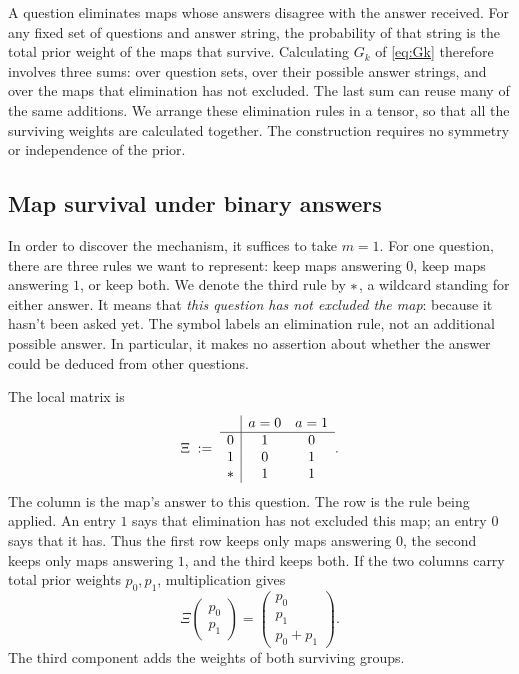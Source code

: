 \documentclass[11pt]{article}
\newcommand{\wild}{\mathord{\text{\normalsize$\ast$}}}
\begin{document}
A question eliminates maps whose answers disagree with the answer received.
For any fixed set of questions and answer string, the probability of that
string is the total prior weight of the maps that survive. Calculating
$G_k$ of \eqref{eq:Gk} therefore involves three sums: over question sets, over their possible
answer strings, and over the maps that elimination has not excluded.
The last sum can reuse many of the same additions. We arrange these
elimination rules in a tensor, so that all the surviving weights are
calculated together. The construction requires no symmetry or independence
of the prior.

\subsection{Map survival under binary answers}

In order to discover the mechanism, it suffices to take $m=1$. For one question, there are three rules we want to represent:
keep maps answering $0$, keep maps answering $1$, or keep both. We denote the third rule by $\wild$, a wildcard standing for either
answer. It means that \emph{this question has not excluded the map}: because it hasn't been asked yet.
The symbol labels an elimination rule, not an additional possible answer.
In particular, it makes no assertion about whether the answer could be
deduced from other questions.

The local matrix is
\begin{equation}\label{eq:Xi-binary}
  \Xi\;:=\;
  \begin{array}{c|cc}
    &a=0&a=1\\ \hline
    0&1&0\\
    1&0&1\\
    \wild&1&1
  \end{array}.
\end{equation}
The column is the map's answer to this question. The row is the rule being
applied. An entry $1$ says that elimination has not excluded this map;
an entry $0$ says that it has. Thus the first row keeps only maps answering
$0$, the second keeps only maps answering $1$, and the third keeps both.
If the two columns carry total prior weights $p_0,p_1$, multiplication gives
\begin{equation}
  \Xi\begin{pmatrix}p_0\\p_1\end{pmatrix}
  =\begin{pmatrix}p_0\\p_1\\p_0+p_1\end{pmatrix}.
\end{equation}
The third component adds the weights of both surviving groups.
\end{document}
